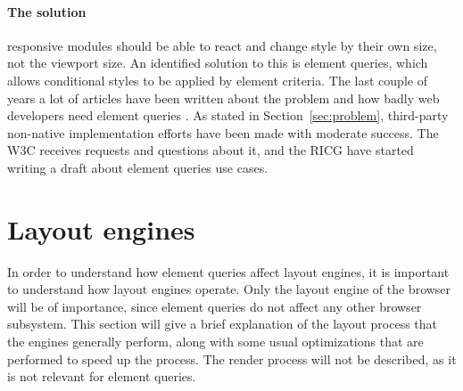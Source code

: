 \documentclass[a4paper,11pt]{kth-mag}
\begin{document}
        \paragraph{The solution}
        \Gls{responsive} modules should be able to react and change style by their own size, not the \gls{viewport} size.
        An identified solution to this is element queries, which allows conditional styles to be applied by \gls{element} criteria.
        The last couple of years a lot of articles have been written about the problem and how badly \gls{web} developers need element queries \cite{eq_article_localised-css,eq_article_backalley,eq_article_mqhack,eq_article_tabatkjr,eq_article_filament,eq_article_tyson,eq_article_neal,eq_article_css-tricks,eq_article_hugo,eq_article_fremycompany,eq_article_discource,eq_article_matt}.
        As stated in Section~\ref{sec:problem}, \gls{third-party} non-\gls{native} implementation efforts have been made with moderate success.
        The \gls{W3C} receives requests and questions about it, and the \gls{RICG} have started writing a draft \cite{ricg_draft} about element queries use cases.

    \section{Layout engines}\label{sec:layout-engines}
      In order to understand how element queries affect \glspl{layout engine}, it is important to understand how \glspl{layout engine} operate.
      Only the \gls{layout engine} of the \gls{browser} will be of importance, since element queries do not affect any other \gls{browser} subsystem.
      This section will give a brief explanation of the layout process that the engines generally perform, along with some usual optimizations that are performed to speed up the process.
      The render process will not be described, as it is not relevant for element queries.
\end{document}

